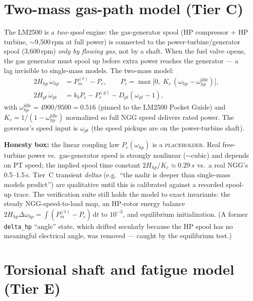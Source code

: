 \documentclass[11pt]{article}
\newcommand{\dd}{\mathrm{d}}
\begin{document}
\section{Two-mass gas-path model (Tier C)}
\label{sec:multishaft}

The LM2500 is a \emph{two-spool} engine: the gas-generator spool (HP
compressor + HP turbine, $\sim$9{,}500\,rpm at full power) is connected to
the power-turbine/generator spool (3{,}600\,rpm) \emph{only by flowing
gas}, not by a shaft. When the fuel valve opens, the gas generator must
spool up before extra power reaches the generator --- a lag invisible to
single-mass models. The two-mass model:
\begin{align}
  2H_{hp}\,\dot\omega_{hp} &= P_m^{(t)} - P_c, \qquad
  P_c = \max\bigl[0,\; K_c\,(\omega_{hp} - \omega_{hp}^\text{idle})\bigr],\\
  2H_{pt}\,\dot\omega_{pt} &= k_b P_c - P_e^{(g)} - D_{pt}(\omega_{pt}-1),
\end{align}
with $\omega_{hp}^\text{idle} = 4900/9500 = 0.516$ (pinned to the LM2500
Pocket Guide) and $K_c = 1/(1-\omega_{hp}^\text{idle})$ normalized so full
NGG speed delivers rated power. The governor's speed input is
$\omega_{pt}$ (the speed pickups are on the power-turbine shaft).

\textbf{Honesty box:} the linear coupling law $P_c(\omega_{hp})$ is a
\textsc{placeholder}. Real free-turbine power vs.\ gas-generator speed is
strongly nonlinear ($\sim$cubic) and depends on PT speed; the implied
spool time constant $2H_{hp}/K_c \approx \SI{0.29}{s}$ vs.\ a real NGG's
0.5--1.5\,s. Tier~C transient \emph{deltas} (e.g.\ ``the nadir is deeper
than single-mass models predict'') are qualitative until this is
calibrated against a recorded spool-up trace. The verification suite still
holds the model to exact invariants: the steady NGG-speed-to-load map, an
HP-rotor energy balance $2H_{hp}\Delta\omega_{hp} = \int (P_m^{(t)} -
P_c)\,\dd t$ to $10^{-3}$, and equilibrium initialization. (A former
\texttt{delta\_hp} ``angle'' state, which drifted secularly because the HP
spool has no meaningful electrical angle, was removed --- caught by the
equilibrium test.)

\section{Torsional shaft and fatigue model (Tier E)}
\label{sec:torsional}
\end{document}
